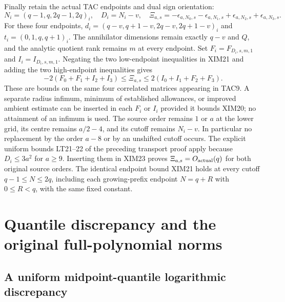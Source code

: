 \documentclass[11pt,a4paper]{article}
\begin{document}
Finally retain the actual TAC endpoints and dual sign orientation:
\[
 N_i=(q-1,q,2q-1,2q)_i,\quad D_i=N_i-v,\quad
 \Xi_{a,s}=-\epsilon_{a,N_0,s}-\epsilon_{a,N_1,s}
             +\epsilon_{a,N_2,s}+\epsilon_{a,N_3,s}.
 \tag{XIM22}
\]
For these four endpoints,
$d_i=(q-v,q+1-v,2q-v,2q+1-v)_i$ and
$t_i=(0,1,q,q+1)_i$. The annihilator dimensions remain exactly
$q-v$ and $Q$, and the analytic quotient rank remains $m$ at every
endpoint. Set $F_i=F_{D_i,s,m,1}$ and $I_i=I_{D_i,s,m,1}$.
Negating the two low-endpoint inequalities in XIM21 and adding the
two high-endpoint inequalities gives
\[
 \boxed{
 -2(F_0+F_1+I_2+I_3)
       \le\Xi_{a,s}\le
  2(I_0+I_1+F_2+F_3).}
 \tag{XIM23}
\]
These are bounds on the same four correlated matrices appearing in
TAC9. A separate radius infimum, minimum of established allowances,
or improved ambient estimate can be inserted in each $F_i$ or $I_i$
provided it bounds XIM20; no attainment of an infimum is used.
The source order remains $1$ or $a$ at the lower grid, its centre
remains $a/2-4$, and its cutoff remains $N_i-v$. In particular no
replacement by the order $a-8$ or by an unshifted cutoff occurs.
The explicit uniform bounds LT21--22 of the preceding transport proof
apply because $D_i\le3a^2$ for $a\ge9$. Inserting them in XIM23
proves $\Xi_{a,s}=O_{\rm actual}(q)$ for both original source orders.
The identical endpoint bound XIM21 holds at every cutoff
$q-1\le N\le2q$, including each growing-prefix endpoint $N=q+R$
with $0\le R<q$, with the same fixed constant.
\endgroup


\section{Quantile discrepancy and the original full-polynomial norms}
\label{sec:dual-web-equilibrium}


\subsection{A uniform midpoint-quantile logarithmic discrepancy}
\end{document}
